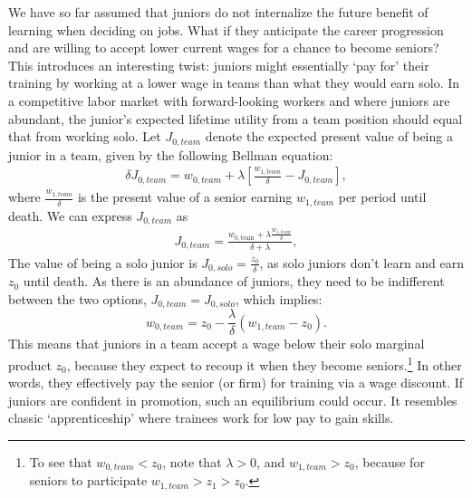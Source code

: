 \documentclass[12pt]{article}
\begin{document}
{We have so far assumed that juniors do not internalize the future benefit of learning when deciding on jobs. What if they anticipate the career progression and are willing to accept lower current wages for a chance to become seniors? This introduces an interesting twist: juniors might essentially `pay for' their training by working at a lower wage in teams than what they would earn solo. In a competitive labor market with forward-looking workers and where juniors are abundant, the junior's expected lifetime utility from a team position should equal that from working solo. Let $J_{0,team}$ denote the expected present value of being a junior in a team, given by the following Bellman equation:
\begin{align*}
\delta J_{0,team} = w_{0,team} + \lambda \left[\frac{w_{1,team}}{\delta} - J_{0,team}\right],
\end{align*}
where $\frac{w_{1,team}}{\delta}$ is the present value of a senior earning $w_{1,team}$ per period until death. We can express $J_{0,team}$ as
\begin{align*}
J_{0,team} = \frac{w_{0,\text{team}} + \lambda \frac{w_{1,team}}{\delta}}{\delta + \lambda},
\end{align*}
The value of being a solo junior is $J_{0,solo} = \frac{z_0}{\delta}$, as solo juniors don't learn and earn $z_0$ until death. As there is an abundance of juniors, they need to be indifferent between the two options, $J_{0,team} = J_{0,solo}$, which implies:
\begin{equation}
w_{0,team} = z_0 - \frac{\lambda}{\delta}(w_{1,team} - z_0). 
\end{equation}
This means that juniors in a team accept a wage below their solo marginal product $z_0$, because they expect to recoup it when they become seniors.\footnote{To see that $w_{0,team}<z_0$, note that $\lambda>0$, and $w_{1,team}>z_0$, because for seniors to participate $w_{1,team}>z_1>z_0$.} In other words, they effectively pay the senior (or firm) for training via a wage discount. If juniors are confident in promotion, such an equilibrium could occur. It resembles classic `apprenticeship' where trainees work for low pay to gain skills.

}
\end{document}
